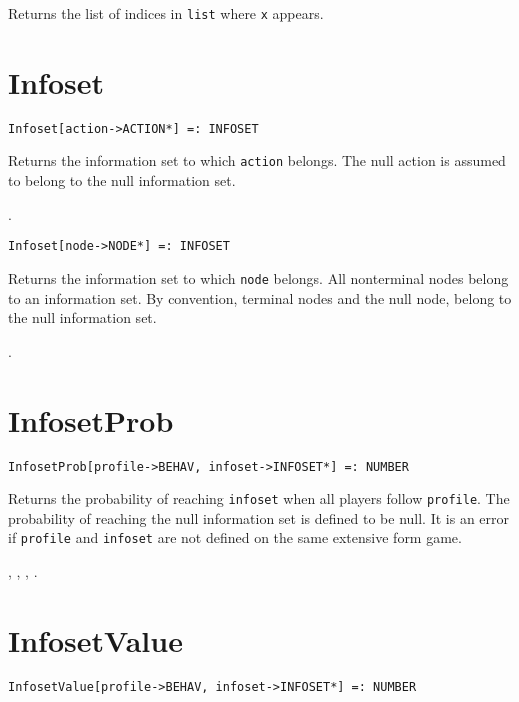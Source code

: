 \noindent
Returns the list of indices in \verb+list+ where \verb+x+ appears.


\section*{Infoset}\label{PrimInfoset}
\begin{verbatim}
Infoset[action->ACTION*] =: INFOSET 
\end{verbatim}

\noindent
Returns the information set to which \verb+action+ belongs.  The null
action is assumed to belong to the null information set.

\seealso {}.

\newsignature

\begin{verbatim}
Infoset[node->NODE*] =: INFOSET 
\end{verbatim}

\noindent
Returns the information set to which \verb+node+ belongs.  All
nonterminal nodes belong to an information set.  By convention,
terminal nodes and the null node, belong to the null information set.

\seealso {}.


\section*{InfosetProb}\label{PrimInfosetProb}
\begin{verbatim}
InfosetProb[profile->BEHAV, infoset->INFOSET*] =: NUMBER 
\end{verbatim}

\noindent
Returns the probability of reaching \verb+infoset+ when all players
follow \verb+profile+.  The probability of reaching the null information
set is defined to be null.  It is an error if \verb+profile+ and
\verb+infoset+ are not defined on the same extensive form game.

\seealso
{},
,
,
.


\section*{InfosetValue}\label{PrimInfosetValue}
\begin{verbatim}
InfosetValue[profile->BEHAV, infoset->INFOSET*] =: NUMBER 
\end{verbatim}

